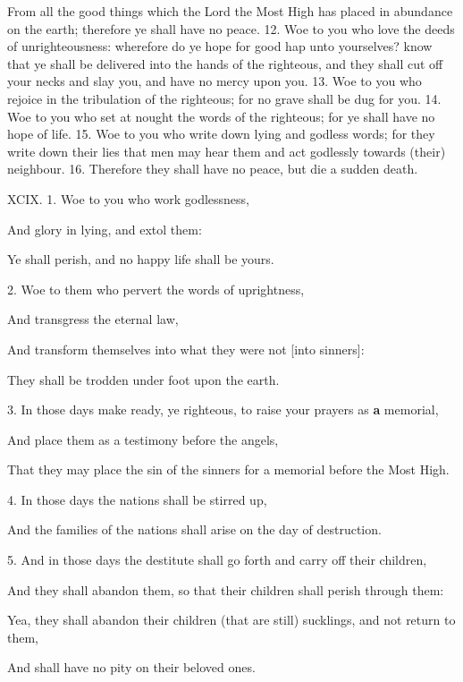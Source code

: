 From all the good things which the Lord the Most
High has placed in abundance on the earth; therefore
ye shall have no peace. 12. Woe to you who love
the deeds of unrighteousness: wherefore do ye hope
for good hap unto yourselves? know that ye shall be
delivered into the hands of the righteous, and they
shall cut off your necks and slay you, and have no
mercy upon you. 13. Woe to you who rejoice in the
tribulation of the righteous; for no grave shall be
dug for you. 14. Woe to you who set at nought the
words of the righteous; for ye shall have no hope
of life. 15. Woe to you who write down lying and
godless words; for they write down their lies that
men may hear them and act godlessly towards
(their) neighbour. 16. Therefore they shall have no
peace, but die a sudden death.


XCIX. 1. Woe to you who work godlessness,

And glory in lying, and extol them:

Ye shall perish, and no happy life shall be yours.

2. Woe to them who pervert the words of uprightness,

And transgress the eternal law,

And transform themselves into what they were not [into sinners]:

They shall be trodden under foot upon the earth.

3. In those days make ready, ye righteous, to raise your prayers as \textbf{a} memorial,

And place them as a testimony before the angels,

That they may place the sin of the sinners for a memorial before the Most High.

4. In those days the nations shall be stirred up,

And the families of the nations shall arise on the day of destruction.

5. And in those days the destitute shall go forth and carry off their children,

And they shall abandon them, so that their children shall perish through them:

Yea, they shall abandon their children (that are still) sucklings, and not return to them,

And shall have no pity on their beloved ones.

